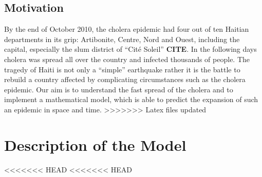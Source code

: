 \documentclass[11pt]{article}
\begin{document}
\subsection{Motivation}
By the end of October 2010, the cholera epidemic had four out of ten Haitian departments in its grip: Artibonite, Centre, Nord and Ouest, including the capital, especially the slum district of “Cit\'{e} Soleil” \textbf{CITE}. In the following days cholera was spread all over the country and infected thousands of people. The tragedy of Haiti is not only a “simple” earthquake rather it is the battle to rebuild a country affected by complicating circumstances such as the cholera epidemic. Our aim is to understand the fast spread of the cholera and to implement a mathematical model, which is able to predict the expansion of such an epidemic in space and time.
>>>>>>> Latex files updated













\section{Description of the Model}
<<<<<<< HEAD
<<<<<<< HEAD
\end{document}
